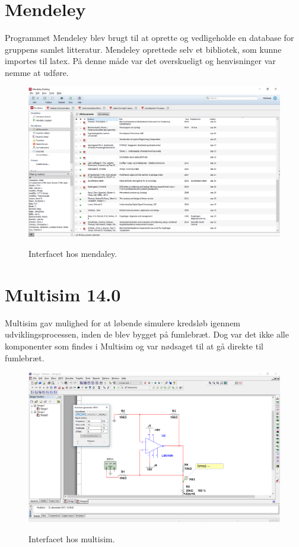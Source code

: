 \section{Mendeley}
Programmet Mendeley blev brugt til at oprette og vedligeholde en database for gruppens samlet litteratur. Mendeley oprettede selv et bibliotek, som kunne importes til latex. På denne måde var det overskueligt og henvisninger var nemme at udføre.

\begin{figure}[H]
\centering
{\includegraphics[width=\linewidth]
{Figure/mendaley}}
\caption{Interfacet hos mendaley.}
\label{mendaley}
\end{figure}


\section{Multisim 14.0}
Multisim gav mulighed for at løbende simulere kredsløb igennem udviklingsprocessen, inden de blev bygget på fumlebræt. Dog var det ikke alle komponenter som findes i Multisim og var nødsaget til at gå direkte til fumlebræt.

\begin{figure}[H]
\centering
{\includegraphics[width=\linewidth]
{Figure/multisim}}
\caption{Interfacet hos multisim.}
\label{multisim}
\end{figure}



